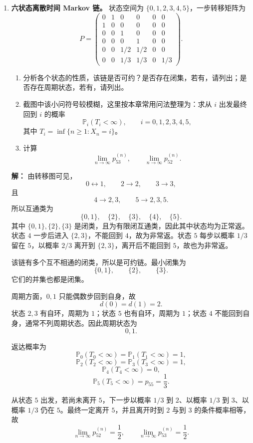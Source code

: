 \documentclass[12pt,a4paper,openany]{ctexrep}
\theoremstyle{definition}
\newcommand{\Pp}{\mathbb{P}}
\begin{document}
\begin{enumerate}[label=\textbf{题 \arabic*:}]
	\item \textbf{六状态离散时间 Markov 链。}
	状态空间为 $\{0,1,2,3,4,5\}$，一步转移矩阵为
	\[
	P=
	\begin{pmatrix}
	0&1&0&0&0&0\\
	1&0&0&0&0&0\\
	0&0&1&0&0&0\\
	0&0&0&1&0&0\\
	0&0&1/2&1/2&0&0\\
	0&0&1/3&1/3&0&1/3
	\end{pmatrix}.
	\]
	\begin{enumerate}[label=(\arabic*)]
		\item 分析各个状态的性质，该链是否可约？是否存在闭集，若有，请列出；是否存在周期状态，若有，请列出。
		\item 截图中该小问符号较模糊，这里按本章常用问法整理为：求从 $i$ 出发最终回到 $i$ 的概率
		\[
		\Pp_i(T_i<\infty),\qquad i=0,1,2,3,4,5,
		\]
		其中 $T_i=\inf\{n\ge1:X_n=i\}$。
		\item 计算
		\[
		\lim_{n\to\infty}p^{(n)}_{53},\qquad
		\lim_{n\to\infty}p^{(n)}_{52}.
		\]
	\end{enumerate}

	\textbf{解：}
	由转移图可见，
	\[
	0\leftrightarrow1,\qquad 2\to2,\qquad 3\to3,
	\]
	且
	\[
	4\to2,3,\qquad 5\to2,3,5.
	\]
	所以互通类为
	\[
	\{0,1\},\quad \{2\},\quad \{3\},\quad \{4\},\quad \{5\}.
	\]
	其中 $\{0,1\},\{2\},\{3\}$ 是闭类，且为有限闭互通类，因此其中状态均为正常返。状态 $4$ 一步后进入 $\{2,3\}$，不能回到 $4$，故为非常返。状态 $5$ 每步以概率 $1/3$ 留在 $5$，以概率 $2/3$ 离开到 $\{2,3\}$，离开后不能回到 $5$，故也为非常返。

	该链有多个互不相通的闭类，所以是可约链。最小闭集为
	\[
	\{0,1\},\qquad \{2\},\qquad \{3\}.
	\]
	它们的并集也都是闭集。

	周期方面，$0,1$ 只能偶数步回到自身，故
	\[
	d(0)=d(1)=2.
	\]
	状态 $2,3$ 有自环，周期为 $1$；状态 $5$ 也有自环，周期为 $1$；状态 $4$ 不能回到自身，通常不列周期状态。因此周期状态为
	\[
	\boxed{0,1}.
	\]

	返达概率为
	\[
	\Pp_0(T_0<\infty)=\Pp_1(T_1<\infty)=1,
	\]
	\[
	\Pp_2(T_2<\infty)=\Pp_3(T_3<\infty)=1,
	\]
	\[
	\Pp_4(T_4<\infty)=0,
	\]
	\[
	\Pp_5(T_5<\infty)=p_{55}=\frac13.
	\]

	从状态 $5$ 出发，若尚未离开 $5$，下一步以概率 $1/3$ 到 $2$、以概率 $1/3$ 到 $3$、以概率 $1/3$ 仍在 $5$。最终一定离开 $5$，并且离开时到 $2$ 与到 $3$ 的条件概率相等，故
	\[
	\boxed{\lim_{n\to\infty}p^{(n)}_{52}=\frac12,\qquad
	\lim_{n\to\infty}p^{(n)}_{53}=\frac12.}
	\]


\end{enumerate}
\end{document}
